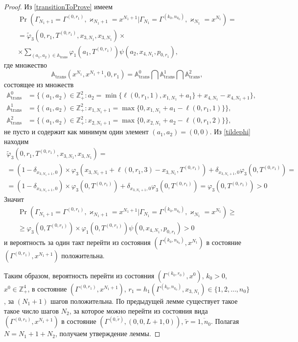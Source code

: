 \documentclass[a4paper,12pt,russian]{extarticle}
\begin{document}
\begin{proof}
Из \eqref{transitionToProve} имеем
\begin{multline*}
\Pr (\Gamma_{N_1+1}=\Gamma^{(0,r_1)},\varkappa_{N_1+1}=x^{N_1+1} | \Gamma_{N_1}=\Gamma^{(k_0,n_{k_0})},\varkappa_{N_1}=x^{N_1})=\\
=\widetilde{\varphi}_3(0,r_1,T^{(0,r_1)},x_{3,N_1},x_{3,N_1})\times \\
\times
\sum_{(a_1,a_2)\in {\mathbb A}_{\mathrm{trans}}}\varphi_1(a_1,T^{(0,r_1)})  \psi(a_2,x_{4,N_1}, p_{0,r_1}),
\end{multline*}
где множество 
\begin{equation*}
{\mathbb A}_{\mathrm{trans}}(x^{N_1},x^{N_1+1},0,r_1) = {\mathbb A}_{\mathrm{trans}}^0 \bigcap {\mathbb A}_{\mathrm{trans}}^1\bigcap {\mathbb A}_{\mathrm{trans}}^2,
\end{equation*}
состоящее из множеств 
\begin{align*}
{\mathbb A}_{\mathrm{trans}}^0 &= \{(a_1,a_2) \in \mathbb{Z}_+^2 \colon a_2 = \min{\{\ell(0,r_1,1), x_{1,N_1}+a_1}\} +x_{4,N_1}-x_{4,N_1+1} \}, \\
{\mathbb A}_{\mathrm{trans}}^1 &= \{(a_1,a_2) \in \mathbb{Z}_+^2 \colon x_{1,N_1+1} =\max{\{0,x_{1,N_1}+a_1-\ell(0,r_1,1)\}}\},\\
 {\mathbb A}_{\mathrm{trans}}^2 &= \{(a_1,a_2) \in \mathbb{Z}_+^2 \colon  x_{2,N_1+1}=\max{\{0,x_{2,N_1}+a_2-\ell(0,r_1,2)\}}\},
\end{align*}
не пусто и содержит как минимум один элемент $(a_1,a_2)=(0,0)$. Из \eqref{tildephi} находим
\begin{multline*}
\widetilde{\varphi}_3(0,r_1,T^{(0,r_1)},x_{3,N_1},x_{3,N_1})=\\=(1-\delta_{x_{3,N_1+1},0}) \times\varphi_3(x_{3,N_1+1} + \ell (0,r_1,3) - x_{3,N_1},T^{(0,r_1)} )
+\delta_{x_{3,N_1+1},0} \varphi_3 (0,T^{(0,r_1)}) = \\=
(1-\delta_{x_{3,N_1+1},0}) \times\varphi_3(0,T^{(0,r_1)} )
+\delta_{x_{3,N_1+1},0} \varphi_3 (0,T^{(0,r_1)}) = \varphi_3 (0,T^{(0,r_1)})> 0
\end{multline*}
Значит
\begin{multline*}
\Pr (\Gamma_{N_1+1}=\Gamma^{(0,r_1)},\varkappa_{N_1+1}=x^{N_1+1} | \Gamma_{N_1}=\Gamma^{(k_0,n_{k_0})},\varkappa_{N_1}=x^{N_1})\geqslant\\
\geqslant\varphi_3 (0,T^{(0,r_1)})
\times
\varphi_1(0,T^{(0,r_1)})  \psi(0,x_{4,N_1}, p_{0,r_1}) > 0
\end{multline*}
и вероятность за один такт перейти из состояния $(\Gamma^{(k_0,n_{k_0})}, x^{N_1})$ в состояние $ (\Gamma^{(0,r_1)}, x^{N_1+1})$ положительна.

Таким образом, вероятность перейти из состояния $(\Gamma^{(k_0,r_0)},x^0)$, $k_0>0$, $x^0 \in \mathbb{Z}_+^4$, в состояние $(\Gamma^{(0,r_1)},x^{N_1+1})$, $r_1=h_1(\Gamma^{(k_0,n_{k_0})},x_{3,N_1}) \in \{1, 2, \ldots, n_0\}$,
за $(N_1+1)$ шагов положительна. По предыдущей лемме существует такое такое число шагов $N_2$, за которое можно перейти из состояния вида $(\Gamma^{(0,r_1)},x^{N_1+1})$ в состояние $(\Gamma^{(0,\tilde{r})},(0,0,L+1,0))$, $\tilde{r}=\overline{1,n_0}$. Полагая $N=N_1+1+N_2$, получаем утверждение леммы.
\end{proof}
\end{document}
